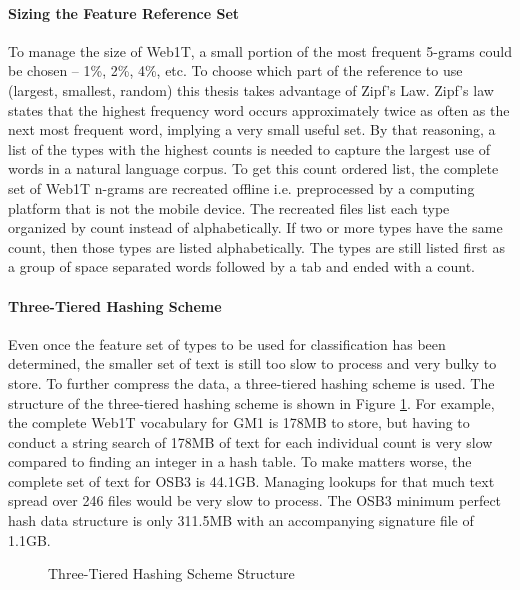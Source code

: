 		\paragraph{Sizing the Feature Reference Set} To manage the size of Web1T, a small portion of the most frequent 5-grams could be chosen -- 1\%, 2\%, 4\%, etc.  To choose which part of the reference to use (largest, smallest, random) this thesis takes advantage of Zipf's Law.  Zipf's law states that the highest frequency word occurs approximately twice as often as the next most frequent word, implying a very small useful set.  By that reasoning, a list of the types with the highest counts is needed to capture the largest use of words in a natural language corpus.  To get this count ordered list, the complete set of Web1T n-grams are recreated offline i.e. preprocessed by a computing platform that is not the mobile device.  The recreated files list each type organized by count instead of alphabetically.  If two or more types have the same count, then those types are listed alphabetically.  The types are still listed first as a group of space separated words followed by a tab and ended with a count.

		\paragraph{Three-Tiered Hashing Scheme} Even once the feature set of types to be used for classification has been determined, the smaller set of text is still too slow to process and very bulky to store.  To further compress the data, a three-tiered hashing scheme is used.  The structure of the three-tiered hashing scheme is shown in Figure \ref{fig:3tierHashStructure}. For example, the complete Web1T vocabulary for GM1 is 178MB to store, but having to conduct a string search of 178MB of text for each individual count is very slow compared to finding an integer in a hash table. To make matters worse, the complete set of text for OSB3 is 44.1GB. Managing lookups for that much text spread over 246 files would be very slow to process. The OSB3 minimum perfect hash data structure is only 311.5MB with an accompanying signature file of 1.1GB.   
		
		\begin{figure}[ht!]
			\begin{center}
				\caption{Three-Tiered Hashing Scheme Structure}
				\label{fig:3tierHashStructure}
			\end{center}
		\end{figure}
		
